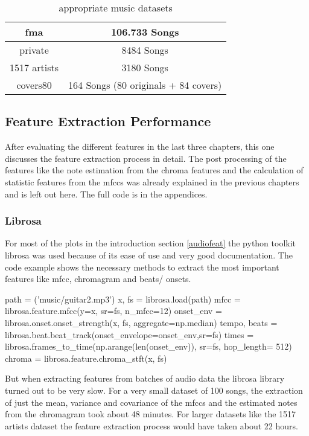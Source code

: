 \begin{table}[h]
	\label{used_dsets}
	\begin{center}
		\begin{tabular}{|c||c|}
			\hline
			fma & 106.733 Songs\\
			\hline
			private & 8484 Songs\\
			\hline
			1517 artists & 3180 Songs\\
			\hline
			covers80 & 164 Songs (80 originals + 84 covers)\\
			\hline
		\end{tabular}
	\end{center}
	\caption{appropriate music datasets}
\end{table}
\FloatBarrier

\subsection{Feature Extraction Performance}

After evaluating the different features in the last three chapters, this one discusses the feature extraction process in detail. The post processing of the features like the note estimation from the chroma features and the calculation of statistic features from the mfccs was already explained in the previous chapters and is left out here. The full code is in the appendices.

\subsubsection{Librosa}

For most of the plots in the introduction section \ref{audiofeat} the python toolkit librosa was used because of its ease of use and very good documentation. The code example shows the necessary methods to extract the most important features like mfcc, chromagram and beats/ onsets.
\lstset{language=Python} 
\begin{pythonCode}[frame=single,label={lst:librosa},caption={librosa},captionpos=b]
path = ('music/guitar2.mp3')
x, fs = librosa.load(path)
mfcc = librosa.feature.mfcc(y=x, sr=fs, n_mfcc=12)
onset_env = librosa.onset.onset_strength(x, fs, aggregate=np.median)
tempo, beats = librosa.beat.beat_track(onset_envelope=onset_env,sr=fs)
times = librosa.frames_to_time(np.arange(len(onset_env)), sr=fs, hop_length= 512)
chroma = librosa.feature.chroma_stft(x, fs)
\end{pythonCode}	
But when extracting features from batches of audio data the librosa library turned out to be very slow. For a very small dataset of 100 songs, the extraction of just the mean, variance and covariance of the mfccs and the estimated notes from the chromagram took about 48 minutes. 
For larger datasets like the 1517 artists dataset the feature extraction process would have taken about 22 hours. 

